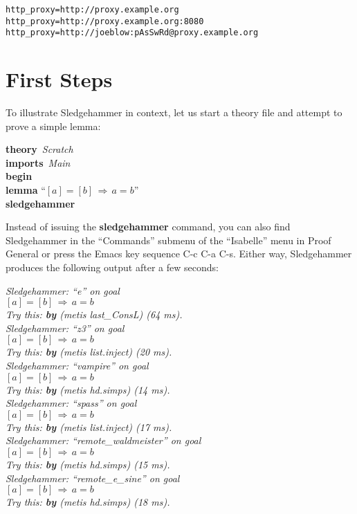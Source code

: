 \documentclass[a4paper,12pt]{article}
\begin{document}
\prew
\texttt{http\_proxy=http://proxy.example.org} \\
\texttt{http\_proxy=http://proxy.example.org:8080} \\
\texttt{http\_proxy=http://joeblow:pAsSwRd@proxy.example.org}
\postw

\section{First Steps}
\label{first-steps}

To illustrate Sledgehammer in context, let us start a theory file and
attempt to prove a simple lemma:

\prew
\textbf{theory}~\textit{Scratch} \\
\textbf{imports}~\textit{Main} \\
\textbf{begin} \\[2\smallskipamount]
%
\textbf{lemma} ``$[a] = [b] \,\Longrightarrow\, a = b$'' \\
\textbf{sledgehammer}
\postw

Instead of issuing the \textbf{sledgehammer} command, you can also find
Sledgehammer in the ``Commands'' submenu of the ``Isabelle'' menu in Proof
General or press the Emacs key sequence C-c C-a C-s.
Either way, Sledgehammer produces the following output after a few seconds:

\prew
\slshape
Sledgehammer: ``\textit{e\/}'' on goal \\
$[a] = [b] \,\Longrightarrow\, a = b$ \\
Try this: \textbf{by} (\textit{metis last\_ConsL}) (64 ms). \\[3\smallskipamount]
%
Sledgehammer: ``\textit{z3\/}'' on goal \\
$[a] = [b] \,\Longrightarrow\, a = b$ \\
Try this: \textbf{by} (\textit{metis list.inject}) (20 ms). \\[3\smallskipamount]
%
Sledgehammer: ``\textit{vampire\/}'' on goal \\
$[a] = [b] \,\Longrightarrow\, a = b$ \\
Try this: \textbf{by} (\textit{metis hd.simps}) (14 ms). \\[3\smallskipamount]
%
Sledgehammer: ``\textit{spass\/}'' on goal \\
$[a] = [b] \,\Longrightarrow\, a = b$ \\
Try this: \textbf{by} (\textit{metis list.inject}) (17 ms). \\[3\smallskipamount]
%
Sledgehammer: ``\textit{remote\_waldmeister\/}'' on goal \\
$[a] = [b] \,\Longrightarrow\, a = b$ \\
Try this: \textbf{by} (\textit{metis hd.simps}) (15 ms). \\[3\smallskipamount]
%
Sledgehammer: ``\textit{remote\_e\_sine\/}'' on goal \\
$[a] = [b] \,\Longrightarrow\, a = b$ \\
Try this: \textbf{by} (\textit{metis hd.simps}) (18 ms).
\postw
\end{document}
